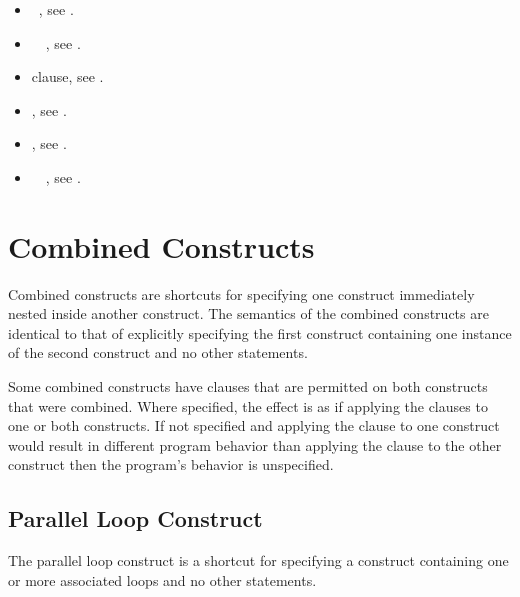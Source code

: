 \crossreferences
\begin{itemize}
\item {}~, see .
\item {}~~, see .
\item {} clause, see .
\item {}, see .
\item {}, see .
\item {}~~, see . 
\end{itemize}



%
%
\section{Combined Constructs}
\label{sec:Combined Constructs}
Combined constructs are shortcuts for specifying one construct immediately nested 
inside another construct. The semantics of the combined constructs are identical to that 
of explicitly specifying the first construct containing one instance of the second 
construct and no other statements.

Some combined constructs have clauses that are permitted on both constructs that were
combined. Where specified, the effect is as if applying the clauses to one or both
constructs. If not specified and applying the clause to one construct would result in
different program behavior than applying the clause to the other construct then the
program's behavior is unspecified.











\subsection{Parallel Loop Construct}
\label{subsec:Parallel Loop Construct}
\summary
The parallel loop construct is a shortcut for specifying a  construct 
containing one or more associated loops and no other statements.

